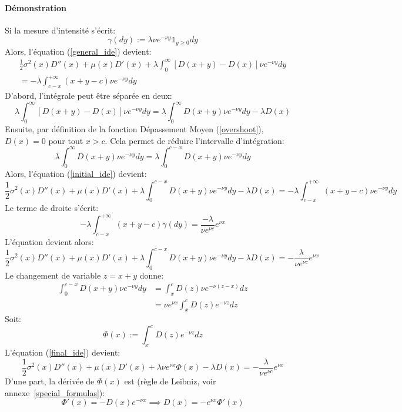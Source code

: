 \paragraph{Démonstration} Si la mesure d'intensité s'écrit:
\[
\gamma(dy):=\lambda\nu e^{-\nu y}\mathds{1}_{y\geq0}dy
\]
Alors, l'équation (\ref{general_ide}) devient:
\begin{equation}\label{initial_ide}
    \begin{aligned}
        \frac{1}{2}\sigma^2(x)D''(x)+\mu(x)D'(x)+\lambda\int_0^\infty[D(x+y)-D(x)]\nu e^{-\nu y}dy\\=-\lambda\int_{c-x}^{+\infty}(x+y-c)\nu e^{-\nu y}dy
    \end{aligned}
\end{equation}
D'abord, l'intégrale peut être séparée en deux:
\[
\lambda\int_0^\infty[D(x+y)-D(x)]\nu e^{-\nu y}dy=\lambda\int_0^\infty D(x+y)\nu e^{-\nu y}dy-\lambda D(x)
\]
Ensuite, par définition de la fonction Dépassement Moyen (\ref{overshoot}), \(D(x)=0\) pour tout \(x>c\). Cela permet de réduire l'intervalle d'intégration:
\[
\lambda\int_0^\infty D(x+y)\nu e^{-\nu y}dy=\lambda\int_0^{c-x}D(x+y)\nu e^{-\nu y}dy
\]
Alors, l'équation (\ref{initial_ide}) devient:
\[
\frac{1}{2}\sigma^2(x)D''(x)+\mu(x)D'(x)+\lambda\int_0^{c-x}D(x+y)\nu e^{-\nu y}dy-\lambda D(x)=-\lambda\int_{c-x}^{+\infty}(x+y-c)\nu e^{-\nu y}dy
\]
Le terme de droite s'écrit:
\[
-\lambda\int_{c-x}^{+\infty}(x+y-c)\gamma(dy)=\frac{-\lambda}{\nu e^{\nu c}}e^{\nu x}
\]
L'équation devient alors:
\begin{equation}\label{final_ide}
    \frac{1}{2}\sigma^2(x)D''(x)+\mu(x)D'(x)+\lambda\int_0^{c-x}D(x+y)\nu e^{-\nu y}dy-\lambda D(x)=-\frac{\lambda}{\nu e^{\nu c}}e^{\nu x}
\end{equation}
Le changement de variable $z=x+y$ donne:
\[
\begin{aligned}
    \int_0^{c-x} D(x+y)\nu e^{-\nu y}dy&=\int_x^c D(z)\nu e^{-\nu(z-x)}dz\\
    &=\nu e^{\nu x}\int_x^c D(z)e^{-\nu z}dz
\end{aligned}
\]
Soit:
\[
\Phi(x):=\int_x^c D(z)e^{-\nu z}dz
\]
L'équation (\ref{final_ide}) devient:
\begin{equation}\label{ODE_Phi_D}
    \frac{1}{2}\sigma^2(x)D''(x)+\mu(x)D'(x)+\lambda\nu e^{\nu x}\Phi(x)-\lambda D(x)=-\frac{\lambda}{\nu e^{\nu c}}e^{\nu x}
\end{equation}
D'une part, la dérivée de $\Phi(x)$ est (règle de Leibniz, voir annexe~\ref{special_formulas}):
\begin{equation}\label{Leibniz_rule}
    \Phi'(x)=-D(x)e^{-\nu x}\implies D(x)=-e^{\nu x }\Phi'(x)
\end{equation}
